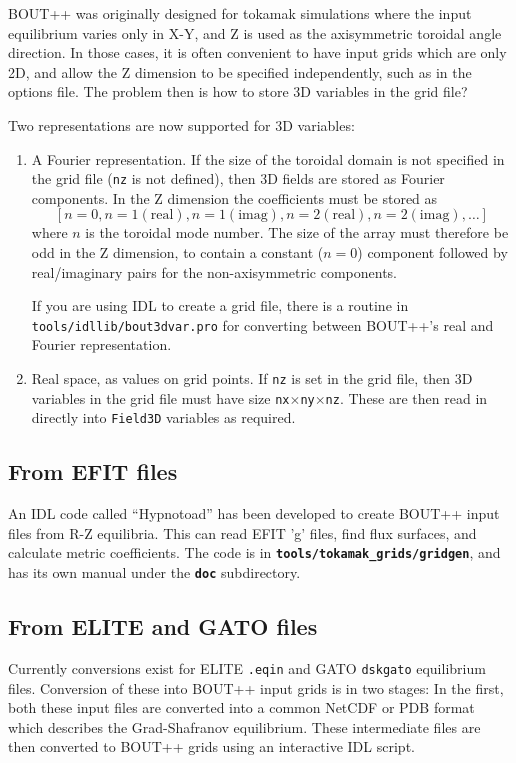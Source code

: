 \documentclass[12pt]{article}
\newcommand{\code}[1]{\texttt{#1}}
\newcommand{\file}[1]{\texttt{\bf #1}}
\begin{document}
BOUT++ was originally designed for tokamak simulations where the input equilibrium varies only in X-Y, and Z is used as
the axisymmetric toroidal angle direction. In those cases, it is often convenient to have input grids which are only 2D,
and allow the Z dimension to be specified independently, such as in the options file. The problem then is how to store 3D variables
in the grid file?

Two representations are now supported for 3D variables:
\begin{enumerate}
\item A Fourier representation. If the size of the toroidal domain is not specified in the grid file (\texttt{nz} is not
defined), then 3D fields are stored as Fourier components. In the Z dimension the coefficients must be stored as
\[
\left[n = 0, n = 1 (\textrm{real}), n = 1 (\textrm{imag}), n = 2 (\textrm{real}), n = 2 (\textrm{imag}), \ldots \right]
\]
where $n$ is the toroidal mode number. The size of the array must therefore be odd in the Z dimension, to contain
a constant ($n=0$) component followed by real/imaginary pairs for the non-axisymmetric components.

If you are using IDL to create a grid file, there is a routine in \texttt{tools/idllib/bout3dvar.pro} for converting
between BOUT++'s real and Fourier representation.

\item Real space, as values on grid points. If \texttt{nz} is set in the grid file, then 3D variables in the grid file must have
  size \texttt{nx}$\times$\texttt{ny}$\times$\texttt{nz}. These are then read in directly into \texttt{Field3D} variables
  as required.
\end{enumerate}





\subsection{From EFIT files}
An IDL code called ``Hypnotoad'' has been developed to create BOUT++ input files from
R-Z equilibria. This can read EFIT 'g' files, find flux surfaces, and calculate metric coefficients.
The code is in \file{tools/tokamak\_grids/gridgen}, and has its own manual under the \file{doc} subdirectory.

\subsection{From ELITE and GATO files}
Currently conversions exist for ELITE \code{.eqin} and GATO \code{dskgato} equilibrium files.
Conversion of these into BOUT++ input grids is in two stages: In the first, both these
input files are converted into a common NetCDF or PDB format which describes the Grad-Shafranov equilibrium.
These intermediate files are then converted to BOUT++ grids using an interactive IDL script.
\end{document}
